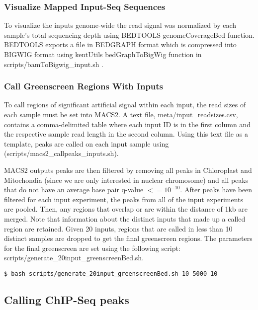 \documentclass{article}
\begin{document}
\begin{sloppypar}
\subsubsection{Visualize Mapped Input-Seq Sequences}
To visualize the inputs genome-wide the read signal was normalized by each sample's total sequencing depth using BEDTOOLS genomeCoverageBed function. BEDTOOLS exports a file in BEDGRAPH format which is compressed into BIGWIG format using kentUtils bedGraphToBigWig function in {\selectfont scripts/bamToBigwig\_input.sh} \cite{kentUtils}.

\subsubsection{Call Greenscreen Regions With Inputs}

To call regions of significant artificial signal within each input, the read sizes of each sample must be set into MACS2. A text file, {\selectfont meta/input\_readsizes.csv}, contains a comma-delimited table where each input ID is in the first column and the respective sample read length in the second column. Using this text file as a template, peaks are called on each input sample using ({\selectfont scripts/macs2\_callpeaks\_inputs.sh}). 

MACS2 outputs peaks are then filtered by removing all peaks in Chloroplast and Mitochondia (since we are only interested in nuclear chromosome) and all peaks that do not have an average base pair q-value $<=10^{-10}$. After peaks have been filtered for each input experiment, the peaks from all of the input experiments are pooled. Then, any regions that overlap or are within the distance of 1kb are merged. Note that information about the distinct inputs that made up a called region are retained. Given 20 inputs, regions that are called in less than 10 distinct samples are dropped to get the final greenscreen regions. The parameters for the final greenscreen are set using the following script: {\selectfont scripts/generate\_20input\_greenscreenBed.sh}.

\begin{verbatim}
$ bash scripts/generate_20input_greenscreenBed.sh 10 5000 10
\end{verbatim}

\subsection{Calling ChIP-Seq peaks}

\end{sloppypar}
\end{document}
